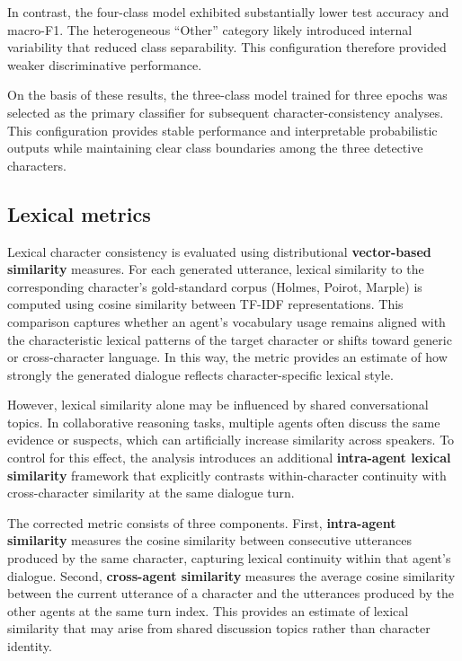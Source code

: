 \documentclass{article}
\begin{document}
In contrast, the four-class model exhibited substantially lower test accuracy and macro-F1. The heterogeneous “Other” category likely introduced internal variability that reduced class separability. This configuration therefore provided weaker discriminative performance.

On the basis of these results, the three-class model trained for three epochs was selected as the primary classifier for subsequent character-consistency analyses. This configuration provides stable performance and interpretable probabilistic outputs while maintaining clear class boundaries among the three detective characters.

\subsection{Lexical metrics}


Lexical character consistency is evaluated using distributional \textbf{vector-based similarity} measures. For each generated utterance, lexical similarity to the corresponding character’s gold-standard corpus (Holmes, Poirot, Marple) is computed using cosine similarity between TF-IDF representations. This comparison captures whether an agent’s vocabulary usage remains aligned with the characteristic lexical patterns of the target character or shifts toward generic or cross-character language. In this way, the metric provides an estimate of how strongly the generated dialogue reflects character-specific lexical style.

However, lexical similarity alone may be influenced by shared conversational topics. In collaborative reasoning tasks, multiple agents often discuss the same evidence or suspects, which can artificially increase similarity across speakers. To control for this effect, the analysis introduces an additional \textbf{intra-agent lexical similarity} framework that explicitly contrasts within-character continuity with cross-character similarity at the same dialogue turn.

The corrected metric consists of three components. First, \textbf{intra-agent similarity} measures the cosine similarity between consecutive utterances produced by the same character, capturing lexical continuity within that agent’s dialogue. Second, \textbf{cross-agent similarity} measures the average cosine similarity between the current utterance of a character and the utterances produced by the other agents at the same turn index. This provides an estimate of lexical similarity that may arise from shared discussion topics rather than character identity.
\end{document}
